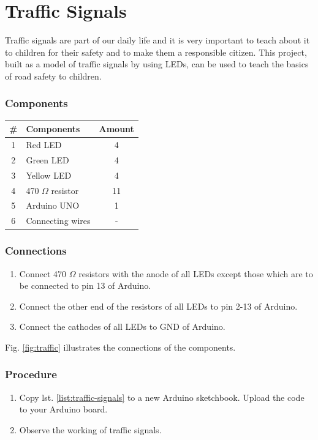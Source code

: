 \chapter{Traffic Signals}

Traffic signals are part of our daily life and it is very important to teach about it to children for their safety and to make them a responsible citizen. This project, built as a model of traffic signals by using LEDs, can be used to teach the basics of road safety to children.

\subsection*{Components}
\begin{table}[H]
    \centering
    \begin{tabular}{|c|l|c|}\hline
     \textbf{\#} & \textbf{Components} &  \textbf{Amount}\\\hline
     1 & Red LED                & 4 \\\hline
     2 & Green LED              & 4 \\\hline
     3 & Yellow LED             & 4 \\\hline
     4 & 470 $\Omega$ resistor   & 11 \\\hline
     5 & Arduino UNO            & 1 \\\hline
     6 & Connecting wires       & - \\\hline
    \end{tabular}
\end{table}

\subsection*{Connections}

\begin{enumerate}[leftmargin=*]
    \item Connect 470 $\Omega$ resistors with the anode of all LEDs except those which are to be connected to pin 13 of Arduino.
    \item Connect the other end of the resistors of all LEDs to pin 2-13 of Arduino.
    \item Connect the cathodes of all LEDs to GND of Arduino.
\end{enumerate}

Fig. \ref{fig:traffic} illustrates the connections of the components.
	
\subsection*{Procedure}
\begin{enumerate}[leftmargin=*]
     \item Copy lst. \ref{list:traffic-signals} to a new Arduino sketchbook. Upload the code to your Arduino board.
    \item Observe the working of traffic signals. 
    
\end{enumerate}

